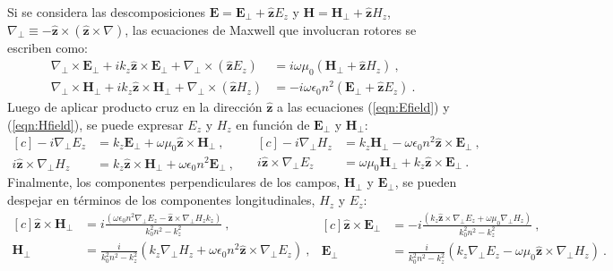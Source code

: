 Si se considera las descomposiciones $\textbf{E}=\textbf{E}_\perp +\hat{\textbf{z}} E_z$ y $\textbf{H}=\textbf{H}_\perp +\hat{\textbf{z}} H_z$, $\nabla_\perp \equiv - \hat{\textbf{z}}\times (\hat{\textbf{z}}\times\nabla)   $, las ecuaciones de Maxwell que involucran rotores se escriben como:
\begin{align}
	\nabla_\perp \times  \textbf{E}_\perp + ik_z \hat{\textbf{z}} \times \textbf{E}_\perp + \nabla_\perp \times (\hat{\textbf{z}} E_z) &= i\omega\mu_0(\textbf{H}_\perp +\hat{\textbf{z}} H_z) \ ,
	\label{eqn:Efield}
	\\
	\nabla_\perp \times  \textbf{H}_\perp + ik_z \hat{\textbf{z}} \times \textbf{H}_\perp + \nabla_\perp \times (\hat{\textbf{z}} H_z) &= -i\omega \epsilon_0 n^2 (\textbf{E}_\perp +\hat{\textbf{z}} E_z) \ .
	\label{eqn:Hfield}
\end{align}
Luego de aplicar producto cruz en la dirección $\hat{\textbf{z}}$ a las ecuaciones (\ref{eqn:Efield}) y (\ref{eqn:Hfield}), se puede expresar $E_z$ y $H_z$ en función de $\textbf{E}_\perp$ y $\textbf{H}_\perp$:
\begin{equation*}
\begin{aligned}[c]
	 -i\nabla_\perp E_z &= k_z\textbf{E}_\perp +\omega \mu_0 \hat{\textbf{z}} \times \textbf{H}_\perp \ ,
	 	  	 \\
	 	  	i\hat{\textbf{z}} \times \nabla_\perp H_z &= k_z \hat{\textbf{z}} \times\textbf{H}_\perp + \omega\epsilon_0 n^2 \textbf{E}_\perp \ ,
\end{aligned} 
\quad
\begin{aligned}[c]
	-i \nabla_\perp H_z &= k_z \textbf{H}_\perp - \omega \epsilon_0 n^2  \hat{\textbf{z}} \times \textbf{E}_\perp \ ,
	\\
	i\hat{\textbf{z}} \times\nabla_\perp E_z &=  \omega \mu_0 \textbf{H}_\perp+k_z  \hat{\textbf{z}} \times \textbf{E}_\perp \ .
\end{aligned}
\end{equation*}
Finalmente, los componentes perpendiculares de los campos, $\textbf{H}_\perp$ y $\textbf{E}_\perp$, se pueden despejar en términos de los componentes longitudinales, $H_z$ y $E_z$:
\begin{equation}
\begin{aligned}[c]
 \hat{\textbf{z}} \times \textbf{H}_\perp &= i\frac{(\omega\epsilon_0 n^2 \nabla_\perp E_z  - \hat{\textbf{z}} \times \nabla_\perp H_z k_z)}{k_0^2 n^2 - k_z^2} \ ,
 \\
\textbf{H}_\perp &= \frac{i}{k_0^2 n^2 - k_z^2}\left(k_z\nabla_\perp H_z + \omega \epsilon_0 n^2\hat{\textbf{z}} \times \nabla_\perp E_z\right) \ ,
\end{aligned}
\begin{aligned}[c]
	\hat{\textbf{z}} \times \textbf{E}_\perp &= -i\frac{(k_z\hat{\textbf{z}} \times \nabla_\perp E_z + \omega\mu_0 \nabla_\perp H_z)  }{k_0^2 n^2 - k_z^2} \ ,
	\\
\textbf{E}_\perp &= \frac{i}{k_0^2 n^2 - k_z^2}\left(k_z \nabla_\perp E_z - \omega\mu_0 \hat{\textbf{z}} \times \nabla_\perp H_z\right) \ . \label{eqn:transversal}
\end{aligned}
\end{equation}
